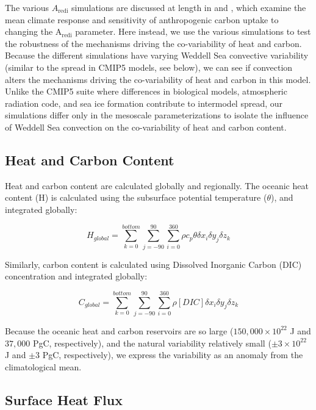 The various $A_{\mathrm{redi}}$ simulations are discussed at length in
\citet{Pradal2014} and \citet{AnandGnanadesikan2015}, which examine the mean
climate response and sensitivity of anthropogenic carbon uptake to changing the
A$_{\mathrm{redi}}$ parameter. Here instead, we use the various simulations to
test the robustness of the mechanisms driving the co-variability of heat and
carbon. Because the different simulations have varying Weddell Sea  convective
variability (similar to the spread in CMIP5 models, see below), we can see if
convection alters the mechanisms driving the co-variability of heat and carbon
in this model. Unlike the CMIP5 suite where differences in biological models,
atmospheric radiation code, and sea ice formation contribute to intermodel
spread, our simulations differ only in the mesoscale parameterizations to
isolate the influence of Weddell Sea convection on the co-variability of heat
and carbon content.

\subsection{Heat and Carbon Content}
\label{subsection:Methods Heat and Carbon Content}
Heat and carbon content are calculated globally and regionally. The oceanic heat
content (H) is calculated using the subsurface potential temperature ($\theta$), and
integrated globally:

\begin{equation}
  H_{global} = \sum_{k = 0}^{bottom} \sum_{j = -90}^{90} \sum_{i=0}^{360} \rho
  c_p \theta \delta x_i \delta y_j \delta z_k
\end{equation}

Similarly, carbon content is calculated using Dissolved Inorganic Carbon (DIC)
concentration and integrated globally:

\begin{equation}
  C_{global} = \sum_{k = 0}^{bottom} \sum_{j = -90}^{90} \sum_{i=0}^{360} \rho
  [DIC] \delta x_i \delta y_j \delta z_k
\end{equation}

Because the oceanic heat and carbon reservoirs are so large ($150,000\times10^
{22}$ J and $37,000$ PgC, respectively), and the natural variability relatively
small ($\pm3\times10^{22}$ J and $\pm3$ PgC, respectively), we express the
variability as an anomaly from the climatological mean.

\subsection{Surface Heat Flux}
\label{subsection:Surface Heat Flux Analysis}

